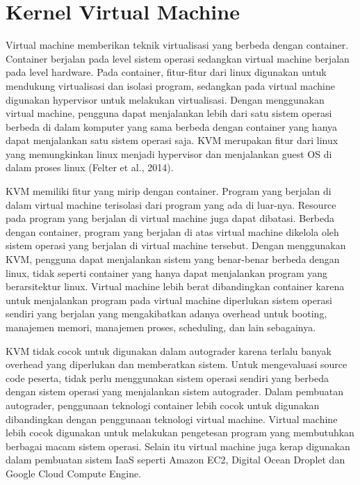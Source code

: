\section{Kernel Virtual Machine}

\par Virtual machine memberikan teknik virtualisasi yang berbeda dengan container. Container berjalan pada level sistem operasi sedangkan virtual machine berjalan pada level hardware. Pada container, fitur-fitur dari linux digunakan untuk mendukung virtualisasi dan isolasi program, sedangkan pada virtual machine digunakan hypervisor untuk melakukan virtualisasi. Dengan menggunakan virtual machine, pengguna dapat menjalankan lebih dari satu sistem operasi berbeda di dalam komputer yang sama berbeda dengan container yang hanya dapat menjalankan satu sistem operasi saja. KVM merupakan fitur dari linux yang memungkinkan linux menjadi hypervisor dan menjalankan guest OS di dalam proses linux (Felter et al., 2014).

\par KVM memiliki fitur yang mirip dengan container. Program yang berjalan di dalam virtual machine terisolasi dari program yang ada di luar-nya. Resource pada program yang berjalan di virtual machine juga dapat dibatasi. Berbeda dengan container, program yang berjalan di atas virtual machine dikelola oleh sistem operasi yang berjalan di virtual machine tersebut. Dengan menggunakan KVM, pengguna dapat menjalankan sistem yang benar-benar berbeda dengan linux, tidak seperti container yang hanya dapat menjalankan program yang berarsitektur linux. Virtual machine lebih berat dibandingkan container karena untuk menjalankan program pada virtual machine diperlukan sistem operasi sendiri yang berjalan yang mengakibatkan adanya overhead untuk booting, manajemen memori, manajemen proses, scheduling, dan lain sebagainya.

\par KVM tidak cocok untuk digunakan dalam autograder karena terlalu banyak overhead yang diperlukan dan memberatkan sistem. Untuk mengevaluasi source code peserta, tidak perlu menggunakan sistem operasi sendiri yang berbeda dengan sistem operasi yang menjalankan sistem autograder. Dalam pembuatan autograder, penggunaan teknologi container lebih cocok untuk digunakan dibandingkan dengan penggunaan teknologi virtual machine. Virtual machine lebih cocok digunakan untuk melakukan pengetesan program yang membutuhkan berbagai macam sistem operasi. Selain itu virtual machine juga kerap digunakan dalam pembuatan sistem IaaS seperti Amazon EC2, Digital Ocean Droplet dan Google Cloud Compute Engine.

